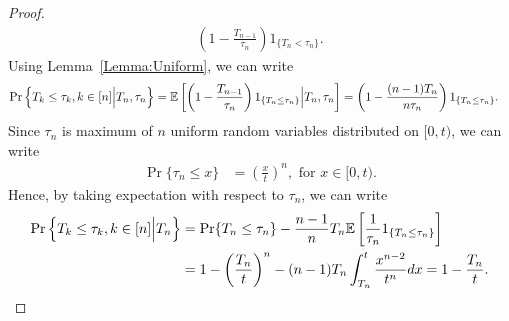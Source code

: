 \documentclass[a4paper,english,10pt]{article}
\begin{document}
\begin{proof}
\begin{align*}
\left(1-\frac{T_{n-1}}{\tau_n}\right)1_{\{T_n < \tau_n\}}.%
\end{align*}
Using Lemma~\ref{Lemma:Uniform}, we can write
\begin{align*}
\Pr\left\{T_k \leq \tau_k, k\in [n] \Big| T_n,  \tau_n\right\} &= \mathbb{E}\left[\left(1-\frac{T_{n-1}}{\tau_n} \right)1_{\{T_n \leq \tau_n\}}\Big| T_n, \tau_n\right]
= \left(1-\frac{(n-1)T_n}{n\tau_n}\right)1_{\{T_n \leq \tau_n\}}.
\end{align*}
Since $\tau_n$ is maximum of $n$ uniform random variables distributed on $[0,t)$, we can write
\begin{align*}
\Pr\{\tau_n \leq x\} &= \left(\frac{x}{t}\right)^n, \text{ for } x \in [0, t).
\end{align*}
Hence, by taking expectation with respect to $\tau_n$, we can write
\begin{align*}
\Pr\left\{T_k \leq \tau_k ,k\in [n] \Big| T_n \right\} %
&= \Pr\{ T_n \leq \tau_n\} -\frac{n-1}{n}T_n\E\left[\frac{1}{\tau_n}1_{\{T_n \leq \tau_n\}}\right]\\
&= 1 - \left(\frac{T_n}{t}\right)^n - (n-1)T_n\int_{T_n}^{t}\frac{x^{n-2}}{t^n}dx = 1 - \frac{T_n}{t}.
\end{align*}
\end{proof}
\end{document}
